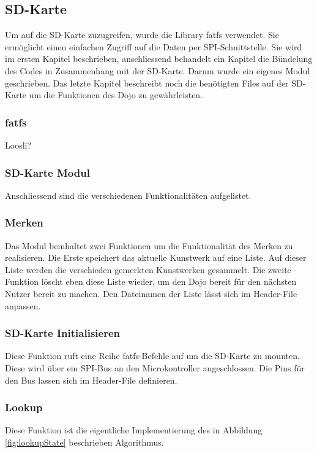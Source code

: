 \subsection{SD-Karte}\label{sec:sdKarte}
Um auf die SD-Karte zuzugreifen, wurde die Library fatfs verwendet. Sie ermöglicht einen einfachen Zugriff auf die Daten per SPI-Schnittstelle. Sie wird im ersten Kapitel beschrieben, anschliessend behandelt ein Kapitel die Bündelung des Codes in Zusammenhang mit der SD-Karte. Darum wurde ein eigenes Modul geschrieben. Das letzte Kapitel beschreibt noch die benötigten Files auf der SD-Karte um die Funktionen des Dojo zu gewährleisten.

\subsubsection{fatfs}
Loosli?

\subsubsection{SD-Karte Modul}
Anschliessend sind die verschiedenen Funktionalitäten aufgelistet.

\subsubsection*{Merken}
Das Modul beinhaltet zwei Funktionen um die Funktionalität des Merken zu realisieren. Die Erste speichert das aktuelle Kunstwerk auf eine Liste. Auf dieser Liste werden die verschieden gemerkten Kunstwerken gesammelt. Die zweite Funktion löscht eben diese Liste wieder, um den Dojo bereit für den nächsten Nutzer bereit zu machen. Den Dateinamen der Liste lässt sich im Header-File anpassen.

\subsubsection*{SD-Karte Initialisieren}
Diese Funktion ruft eine Reihe fatfs-Befehle auf um die SD-Karte zu mounten. Diese wird über ein SPI-Bus an den Microkontroller angeschlossen. Die Pins für den Bus lassen sich im Header-File definieren.

\subsubsection*{Lookup}
Diese Funktion ist die eigentliche Implementierung des in Abbildung \ref{fig:lookupState} beschrieben Algorithmus.

